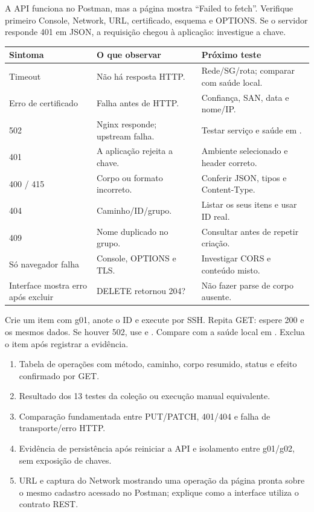 
A API funciona no Postman, mas a página mostra ``Failed to fetch''. Verifique primeiro Console, Network, URL, certificado, esquema e OPTIONS. Se o servidor responde 401 em JSON, a requisição chegou à aplicação: investigue a chave.

\begin{tabularx}{\linewidth}{@{}p{3.3cm}YY@{}}\toprule
Sintoma & O que observar & Próximo teste \\\midrule
Timeout & Não há resposta HTTP. & Rede/SG/rota; comparar com saúde local.\\
Erro de certificado & Falha antes de HTTP. & Confiança, SAN, data e nome/IP.\\
502 & Nginx responde; upstream falha. & Testar serviço e saúde em .\\
401 & A aplicação rejeita a chave. & Ambiente selecionado e header correto.\\
400 / 415 & Corpo ou formato incorreto. & Conferir JSON, tipos e Content-Type.\\
404 & Caminho/ID/grupo. & Listar os seus itens e usar ID real.\\
409 & Nome duplicado no grupo. & Consultar antes de repetir criação.\\
Só navegador falha & Console, OPTIONS e TLS. & Investigar CORS e conteúdo misto.\\
Interface mostra erro após excluir & DELETE retornou 204? & Não fazer parse de corpo ausente.\\\bottomrule
\end{tabularx}

Crie um item com g01, anote o ID e execute  por SSH. Repita GET: espere 200 e os mesmos dados. Se houver 502, use  e . Compare com a saúde local em . Exclua o item após registrar a evidência.

\begin{enumerate}
\item Tabela de operações com método, caminho, corpo resumido, status e efeito confirmado por GET.
\item Resultado dos 13 testes da coleção ou execução manual equivalente.
\item Comparação fundamentada entre PUT/PATCH, 401/404 e falha de transporte/erro HTTP.
\item Evidência de persistência após reiniciar a API e isolamento entre g01/g02, sem exposição de chaves.
\item URL e captura do Network mostrando uma operação da página pronta sobre o mesmo cadastro acessado no Postman; explique como a interface utiliza o contrato REST.
\end{enumerate}

